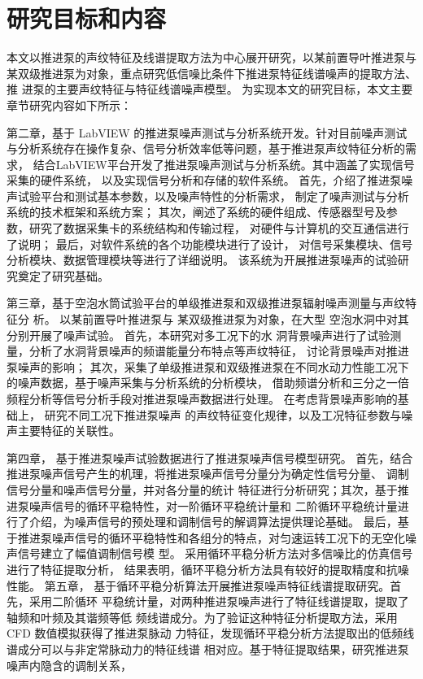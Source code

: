 \section{研究目标和内容}
本文以推进泵的声纹特征及线谱提取方法为中心展开研究，以某前置导叶推进泵与
某双级推进泵为对象，重点研究低信噪比条件下推进泵特征线谱噪声的提取方法、推
进泵的主要声纹特征与特征线谱噪声模型。
为实现本文的研究目标，本文主要章节研究内容如下所示：

第二章，基于 LabVIEW 的推进泵噪声测试与分析系统开发。针对目前噪声测试与分析系统存在操作复杂、信号分析效率低等问题，基于推进泵声纹特征分析的需求，
结合LabVIEW平台开发了推进泵噪声测试与分析系统。其中涵盖了实现信号采集的硬件系统，
以及实现信号分析和存储的软件系统。
首先，介绍了推进泵噪声试验平台和测试基本参数，以及噪声特性的分析需求，
制定了噪声测试与分析系统的技术框架和系统方案；
其次，阐述了系统的硬件组成、传感器型号及参数，研究了数据采集卡的系统结构和传输过程，
对硬件与计算机的交互通信进行了说明；
最后，对软件系统的各个功能模块进行了设计，
对信号采集模块、信号分析模块、数据管理模块等进行了详细说明。
该系统为开展推进泵噪声的试验研究奠定了研究基础。

第三章，基于空泡水筒试验平台的单级推进泵和双级推进泵辐射噪声测量与声纹特征分
析。
以某前置导叶推进泵与
某双级推进泵为对象，在大型
空泡水洞中对其分别开展了噪声试验。
首先，本研究对多工况下的水
洞背景噪声进行了试验测量，分析了水洞背景噪声的频谱能量分布特点等声纹特征，
讨论背景噪声对推进泵噪声的影响；
其次，采集了单级推进泵和双级推进泵在不同水动力性能工况下的噪声数据，基于噪声采集与分析系统的分析模块，
借助频谱分析和三分之一倍频程分析等信号分析手段对推进泵噪声数据进行处理。
在考虑背景噪声影响的基础上，
研究不同工况下推进泵噪声
的声纹特征变化规律，以及工况特征参数与噪声主要特征的关联性。

第四章，
基于推进泵噪声试验数据进行了推进泵噪声信号模型研究。
首先，结合推进泵噪声信号产生的机理，将推进泵噪声信号分量分为确定性信号分量、
调制信号分量和噪声信号分量，并对各分量的统计
特征进行分析研究；其次，基于推进泵噪声信号的循环平稳特性，对一阶循环平稳统计量和
二阶循环平稳统计量进行了介绍，为噪声信号的预处理和调制信号的解调算法提供理论基础。
最后，基于推进泵噪声信号的循环平稳特性和各组分的特点，对匀速运转工况下的无空化噪声信号建立了幅值调制信号模
型。
采用循环平稳分析方法对多信噪比的仿真信号进行了特征提取分析，
结果表明，循环平稳分析方法具有较好的提取精度和抗噪性能。
第五章，
基于循环平稳分析算法开展推进泵噪声特征线谱提取研究。首先，采用二阶循环
平稳统计量，对两种推进泵噪声进行了特征线谱提取，提取了轴频和叶频及其谐频等低
频线谱成分。为了验证这种特征分析提取方法，采用 CFD 数值模拟获得了推进泵脉动
力特征，发现循环平稳分析方法提取出的低频线谱成分可以与非定常脉动力的特征线谱
相对应。基于特征提取结果，研究推进泵噪声内隐含的调制关系，
